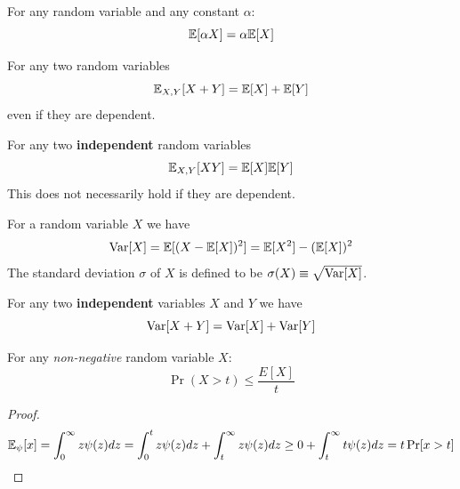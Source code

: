 \documentclass{article}
\begin{document}
\begin{fact}%
For any random variable and any constant $\alpha$:
\begin{equation}
{\mathbb E}[\alpha X] = \alpha {\mathbb E}[X]
\end{equation}
\end{fact}

\begin{fact}%
For any two random variables
\begin{equation}
{\mathbb E}_{X,Y}[X+Y] = {\mathbb E}[X] + {\mathbb E}[Y]
\end{equation}
even if they are dependent.
\end{fact}


\begin{fact}%
For any two {\bf independent} random variables
\begin{equation}
{\mathbb E}_{X,Y}[XY] = {\mathbb E}[X]{\mathbb E}[Y]
\end{equation}
This does not necessarily hold if they are dependent.
\end{fact}

\begin{definition}[Variance]%
For a random variable $X$ we have 
\begin{equation}
{\operatorname{Var}}[X] = {\mathbb E}[(X - {\mathbb E}[X])^2] = {\mathbb E}[X^2] - ({\mathbb E}[X])^2
\end{equation}
The standard deviation $\sigma$ of $X$ is defined to be $\sigma(X) \equiv \sqrt{{\operatorname{Var}}[X]}$.
\end{definition}

\begin{definition}%
For any two {\bf independent} variables $X$ and $Y$ we have 
\begin{equation}
{\operatorname{Var}}[X + Y] = {\operatorname{Var}}[X] + {\operatorname{Var}}[Y]
\end{equation}
\end{definition}

\begin{fact}%
For any {\it non-negative} random variable $X$:
\begin{equation}
\Pr(X > t) \le \frac{E[X]}{t}
\end{equation}
\end{fact}
\begin{proof}
\[
{\mathbb E}_\psi[x] = \int_0^{\infty} z\psi(z)dz = \int_0^{t} z\psi(z)dz + \int_t^{\infty} z\psi(z)dz \ge 0 + \int_t^{\infty} t\psi(z)dz = t \Pr[x>t]
\]
\end{proof}
\end{document}
